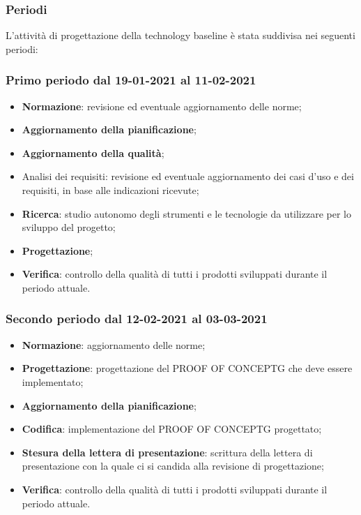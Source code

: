 	\subsubsection{Periodi}
	L’attività di progettazione della technology baseline è stata suddivisa nei seguenti periodi:
	
	\subsubsection{Primo periodo dal 19-01-2021 al 11-02-2021}
	\begin{itemize}
	\item \textbf{Normazione}: revisione ed eventuale aggiornamento delle norme;
	\item \textbf{Aggiornamento della pianificazione};
	\item \textbf{Aggiornamento della qualità};
	\item {Analisi dei requisiti}: revisione ed eventuale aggiornamento dei casi d’uso e dei requisiti, in base
	alle indicazioni ricevute;
	\item \textbf{Ricerca}: studio autonomo degli strumenti e le tecnologie da utilizzare per lo sviluppo del
	progetto;
	\item \textbf{Progettazione};
	\item \textbf{Verifica}: controllo della qualità di tutti i prodotti sviluppati durante il periodo attuale.
	\end{itemize}

	\subsubsection{Secondo periodo dal 12-02-2021 al 03-03-2021}
	\begin{itemize}
	\item \textbf{Normazione}: aggiornamento delle norme;
	\item \textbf{Progettazione}: progettazione del PROOF OF CONCEPTG che deve essere implementato;
	\item \textbf{Aggiornamento della pianificazione};
	\item \textbf{Codifica}: implementazione del PROOF OF CONCEPTG progettato;
	\item \textbf{Stesura della lettera di presentazione}: scrittura della lettera di presentazione con la quale ci
	si candida alla revisione di progettazione;
	\item \textbf{Verifica}: controllo della qualità di tutti i prodotti sviluppati durante il periodo attuale.
	\end{itemize}	
	
